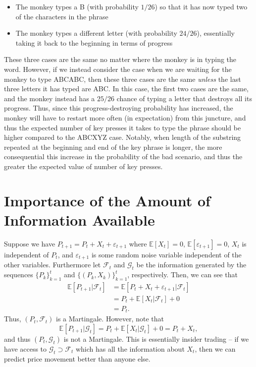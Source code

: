 \documentclass[12pt]{report}
\begin{document}
{\begin{itemize}
		\item The monkey types a B (with probability $1/26$) so that it has now typed two of the characters in the phrase
		\item The monkey types a different letter (with probability $24/26$), essentially taking it back to the beginning in terms of progress
	\end{itemize} These three cases are the same no matter where the monkey is in typing the word. However, if we instead consider the case when we are waiting for the monkey to type ABCABC, then these three cases are the same \textit{unless} the last three letters it has typed are ABC. In this case, the first two cases are the same, and the monkey instead has a $25/26$ chance of typing a letter that destroys all its progress. Thus, since this progress-destroying probability has increased, the monkey will have to restart more often (in expectation) from this juncture, and thus the expected number of key presses it takes to type the phrase should be higher compared to the ABCXYZ case. Notably, when length of the substring repeated at the beginning and end of the key phrase is longer, the more consequential this increase in the probability of the bad scenario, and thus the greater the expected value of number of key presses.
}

\section{Importance of the Amount of Information Available}
Suppose we have $P_{t+1}=P_t+X_t+\varepsilon_{t+1}$ where $\mathbb E[X_t]=0$, $\mathbb E[\varepsilon_{t+1}]=0$, $X_t$ is independent of $P_t$, and $\varepsilon_{t+1}$ is some random noise variable independent of the other variables. Furthermore let $\mathcal F_t$ and $\mathcal G_t$ be the information generated by the sequences $\{P_k\}_{k=1}^t$ and $\{(P_k,X_k)\}_{k=1}^t$, respectively. Then, we can see that \begin{align*}
	\mathbb E[P_{t+1}|\mathcal F_t] &= \mathbb E[P_t+X_t+\varepsilon_{t+1}|\mathcal F_t] \\
									&= P_t + \mathbb E[X_t|\mathcal F_t] + 0 \\
									&= P_t.
\end{align*} Thus, $(P_t,\mathcal F_t)$ is a Martingale. However, note that $$\mathbb E[P_{t+1}|\mathcal G_t] = P_t + \mathbb E[X_t|\mathcal G_t] + 0 = P_t + X_t,$$ and thus $(P_t,\mathcal G_t)$ is not a Martingale. This is essentially insider trading -- if we have access to $\mathcal G_t\supset \mathcal F_t$ which has all the information about $X_t$, then we can predict price movement better than anyone else.
\end{document}
